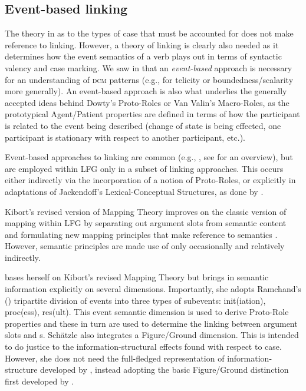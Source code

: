 \documentclass[output=paper,hidelinks]{langscibook}
\begin{document}
 
\subsection{Event-based linking}
\label{sec:new-link}
\largerpage

The theory in  as to the types of case that must be
accounted for does not make reference to linking. However, a theory of linking
is clearly also needed as it determines how the event semantics of a verb plays
out in terms of syntactic valency and case marking.  We saw in  that an {\em event-based} approach is necessary for  an understanding
of \textsc{dcm} patterns (e.g., for telicity or boundedness/scalarity more generally).
An event-based approach is also what underlies the generally accepted ideas behind Dowty's Proto-Roles or Van
Valin's Macro-Roles, as the prototypical Agent/Patient properties are defined in terms of how
the participant is related to the event being described (change of state
is being effected,  one participant is stationary with respect to another
participant, etc.).

Event-based approaches to linking are common (e.g.,
\citealt{jackendoff1990semantic,VanValin1997,rappaport-levin98, croft2012}, see
\citet{levin-hovav05} for an overview), but are employed within LFG only in a
subset of linking approaches. This occurs either indirectly via the
incorporation of a notion of Proto-Roles, or explicitly in adaptations of
Jackendoff's Lexical-Conceptual Structures, as done by \citet{Butt1995}.

Kibort's revised version of Mapping Theory improves on the classic version of
mapping within
LFG by separating out argument slots from semantic content and
formulating new mapping principles that make reference to semantics
\citep{kibort14}.  However, semantic principles are made use of only
occasionally and relatively indirectly.

\citet{schaetzle18} bases herself on
Kibort's revised Mapping Theory but brings in semantic information explicitly on
several dimensions.  Importantly, she adopts Ramchand's (\citeyear{ramchand08})
tripartite division of events into three types of subevents: init(iation),
proc(ess), res(ult).  This event semantic dimension is used to derive Proto-Role
properties and these in turn are used to determine the linking between argument
slots and {\GF}s.  Sch\"{a}tzle also integrates a Figure/Ground dimension. This
is intended to do justice to the information-structural effects found with
respect to case.  However, she does not need the full-fledged representation
of information-structure developed by \citet{DN}, instead adopting   the basic
Figure/Ground distinction first developed by \citet{talmy78}.
\end{document}

